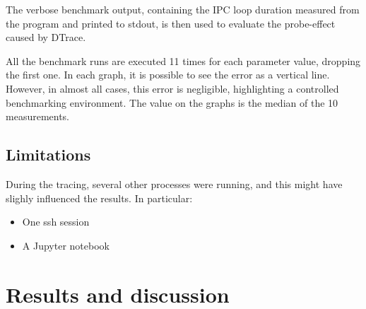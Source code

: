 \documentclass[a4paper,10pt]{article}
\begin{document}
The verbose benchmark output, containing the IPC loop duration measured from the program and printed to stdout, is then used to evaluate the probe-effect caused by DTrace.


All the benchmark runs are executed 11 times for each parameter value, dropping the first one. In each graph, it is possible to see the error as a vertical line. However, in almost all cases, this error is negligible, highlighting a controlled benchmarking environment. The value on the graphs is the median of the 10 measurements.

\subsection{Limitations}

During the tracing, several other processes were running, and this might have slighly influenced the results. In particular:
\begin{itemize}
    \item One ssh session
    \item A Jupyter notebook
\end{itemize}


\section{Results and discussion}
\end{document}
